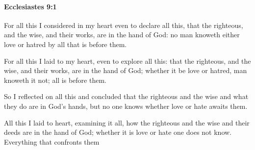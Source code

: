 		\paragraph{Ecclesiastes 9:1} %
			\label{ECCLESIASTES-9-1}

			For all this I considered in my heart even to declare all this, that the righteous, and the wise, and their works, are in the hand of God: no man knoweth either love or hatred by all that is before them.

			\begin{versebox}
					\item[BHS] 
					\item[LXX] 
					\item[ASV] For all this I laid to my heart, even to explore all this: that the righteous, and the wise, and their works, are in the hand of God; whether it be love or hatred, man knoweth it not; all is before them.
					\item[NIV] So I reflected on all this and concluded that the righteous and the wise and what they do are in God’s hands, but no one knows whether love or hate awaits them.
					\item[NRSV] All this I laid to heart, examining it all, how the righteous and the wise and their deeds are in the hand of God; whether it is love or hate one does not know. Everything that confronts them
			\end{versebox}


